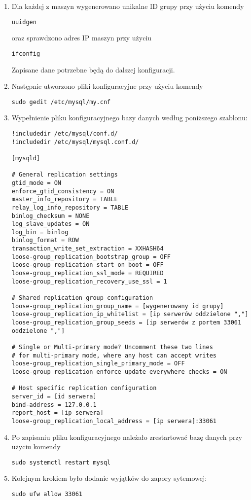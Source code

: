 \documentclass[]{article}
\begin{document}
\begin{enumerate}
\def\labelenumi{\arabic{enumi}.}
\item
  Dla każdej z maszyn wygenerowano unikalne ID grupy przy użyciu komendy

\begin{verbatim}
uuidgen
\end{verbatim}

  oraz sprawdzono adres IP maszyn przy użyciu

\begin{verbatim}
ifconfig
\end{verbatim}

  Zapisane dane potrzebne będą do dalszej konfiguracji.
\item
  Następnie utworzono pliki konfiguracyjne przy użyciu komendy

\begin{verbatim}
sudo gedit /etc/mysql/my.cnf
\end{verbatim}
\item
  Wypełnienie pliku konfiguracyjnego bazy danych według poniższego
  szablonu:

\begin{verbatim}
!includedir /etc/mysql/conf.d/
!includedir /etc/mysql/mysql.conf.d/

[mysqld]

# General replication settings
gtid_mode = ON
enforce_gtid_consistency = ON
master_info_repository = TABLE
relay_log_info_repository = TABLE
binlog_checksum = NONE
log_slave_updates = ON
log_bin = binlog
binlog_format = ROW
transaction_write_set_extraction = XXHASH64
loose-group_replication_bootstrap_group = OFF
loose-group_replication_start_on_boot = OFF
loose-group_replication_ssl_mode = REQUIRED
loose-group_replication_recovery_use_ssl = 1

# Shared replication group configuration
loose-group_replication_group_name = [wygenerowany id grupy]
loose-group_replication_ip_whitelist = [ip serwerów oddzielone ","]
loose-group_replication_group_seeds = [ip serwerów z portem 33061 oddzielone ","]

# Single or Multi-primary mode? Uncomment these two lines
# for multi-primary mode, where any host can accept writes
loose-group_replication_single_primary_mode = OFF
loose-group_replication_enforce_update_everywhere_checks = ON

# Host specific replication configuration
server_id = [id serwera]
bind-address = 127.0.0.1
report_host = [ip serwera]
loose-group_replication_local_address = [ip serwera]:33061
\end{verbatim}
\item
  Po zapisaniu pliku konfiguracyjnego należało zrestartować bazę danych
  przy użyciu komendy

\begin{verbatim}
sudo systemctl restart mysql
\end{verbatim}
\item
  Kolejnym krokiem było dodanie wyjątków do zapory sytemowej:

\begin{verbatim}
sudo ufw allow 33061
\end{verbatim}
\end{enumerate}
\end{document}
